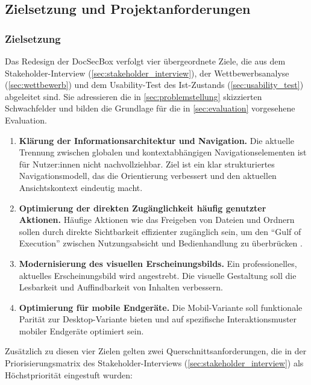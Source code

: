 \subsection{Zielsetzung und Projektanforderungen}

\subsubsection{Zielsetzung}\label{subsec:zielsetzung}

Das Redesign der DocSecBox verfolgt vier übergeordnete Ziele, die aus dem Stakeholder-Interview (\autoref{sec:stakeholder_interview}), der Wettbewerbsanalyse (\autoref{sec:wettbewerb}) und dem Usability-Test des Ist-Zustands (\autoref{sec:usability_test}) abgeleitet sind. Sie adressieren die in \autoref{sec:problemstellung} skizzierten Schwachfelder und bilden die Grundlage für die in \autoref{sec:evaluation} vorgesehene Evaluation.

\begin{enumerate}
    \item \textbf{Klärung der Informationsarchitektur und Navigation.} Die aktuelle Trennung zwischen globalen und kontextabhängigen Navigationselementen ist für Nutzer:innen nicht nachvollziehbar. Ziel ist ein klar strukturiertes Navigationsmodell, das die Orientierung verbessert und den aktuellen Ansichtskontext eindeutig macht.
    \item \textbf{Optimierung der direkten Zugänglichkeit häufig genutzter Aktionen.} Häufige Aktionen wie das Freigeben von Dateien und Ordnern sollen durch direkte Sichtbarkeit effizienter zugänglich sein, um den \enquote{Gulf of Execution} zwischen Nutzungsabsicht und Bedienhandlung zu überbrücken \parencite[Kap.~2.1]{normanDesignEverydayThings2013}.
    \item \textbf{Modernisierung des visuellen Erscheinungsbilds.} Ein professionelles, aktuelles Erscheinungsbild wird angestrebt. Die visuelle Gestaltung soll die Lesbarkeit und Auffindbarkeit von Inhalten verbessern.
    \item \textbf{Optimierung für mobile Endgeräte.} Die Mobil-Variante soll funktionale Parität zur Desktop-Variante bieten und auf spezifische Interaktionsmuster mobiler Endgeräte optimiert sein.
\end{enumerate}

Zusätzlich zu diesen vier Zielen gelten zwei Querschnittsanforderungen, die in der Priorisierungsmatrix des Stakeholder-Interviews (\autoref{sec:stakeholder_interview}) als Höchstpriorität eingestuft wurden:

